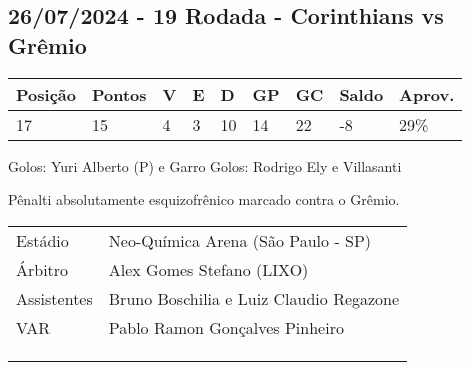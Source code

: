 \newpage
\subsection{26/07/2024 - 19 Rodada - Corinthians vs Grêmio}

\begin{table}[H]
\begin{tabular}{|l|l|l|l|l|l|l|l|l|}
\hline
\textbf{Posição} & \textbf{Pontos} & \textbf{V} & \textbf{E} & \textbf{D} & \textbf{GP} & \textbf{GC} & \textbf{Saldo} & \textbf{Aprov.} \\ \hline
17               & 15              & 4          & 3          & 10         & 14                & 22                   & -8             & 29\%                    \\ \hline
\end{tabular}
\end{table}

\begin{figure}[H]
    \centering
    
\end{figure}

Golos: Yuri Alberto (P) e Garro
Golos: Rodrigo Ely e Villasanti

Pênalti absolutamente esquizofrênico marcado contra o Grêmio.

\begin{table}[H]
\begin{tabular}{ll}
Estádio     & Neo-Química Arena (São Paulo - SP)      \\
Árbitro     & Alex Gomes Stefano (LIXO)               \\
Assistentes & Bruno Boschilia e Luiz Claudio Regazone \\
VAR         & Pablo Ramon Gonçalves Pinheiro          \\
            &                                         \\
            &                                         \\
            &                                        
\end{tabular}
\end{table}

